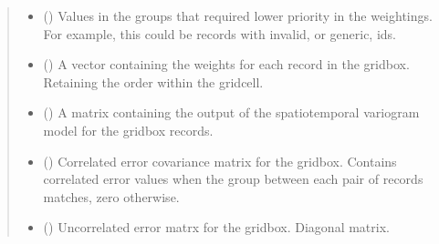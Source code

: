 \documentclass[letterpaper,10pt,english]{sphinxmanual}
\begin{document}
\begin{fulllineitems}
\begin{quote}
\begin{description}
\begin{itemize}
\item {}
\sphinxAtStartPar
{} (\sphinxstyleliteralemphasis{\sphinxupquote{ | }}\sphinxstyleliteralemphasis{\sphinxupquote{{[}}}\sphinxstyleliteralemphasis{\sphinxupquote{{]} }}\sphinxstyleliteralemphasis{\sphinxupquote{| }}) \textendash{} Values in the groups that required lower priority in the weightings.
For example, this could be records with invalid, or generic, ids.

\end{itemize}

\sphinxAtStartPar
{}

\sphinxAtStartPar
\begin{itemize}
\item {}
\sphinxAtStartPar
{} () \textendash{} A vector containing the weights for each record in the grid\sphinxhyphen{}box.
Retaining the order within the grid\sphinxhyphen{}cell.

\item {}
\sphinxAtStartPar
{} () \textendash{} A matrix containing the output of the spatio\sphinxhyphen{}temporal variogram model
for the grid\sphinxhyphen{}box records.

\item {}
\sphinxAtStartPar
{} () \textendash{} Correlated error covariance matrix for the grid\sphinxhyphen{}box. Contains correlated
error values when the group between each pair of records matches, zero
otherwise.

\item {}
\sphinxAtStartPar
{} () \textendash{} Uncorrelated error matrx for the grid\sphinxhyphen{}box. Diagonal matrix.

\end{itemize}


\end{description}\end{quote}

\end{fulllineitems}
\end{document}
